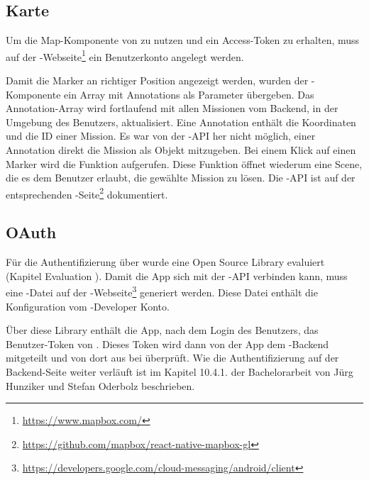 \subsection{Karte}
Um die Map-Komponente von  zu nutzen und ein Access-Token zu erhalten, muss auf der -Webseite\footnote{\url{https://www.mapbox.com/}} ein Benutzerkonto angelegt werden. 

Damit die Marker an richtiger Position angezeigt werden, wurden der -Komponente ein Array mit Annotations als Parameter übergeben. 
Das Annotation-Array wird fortlaufend mit allen Missionen vom \gls{Backend}, in der Umgebung des Benutzers, aktualisiert. 
Eine Annotation enthält die Koordinaten und die ID einer Mission. 
Es war von der -\gls{API} her nicht möglich, einer Annotation direkt die Mission als Objekt mitzugeben. 
Bei einem Klick auf einen Marker wird die Funktion  aufgerufen.
Diese Funktion öffnet wiederum eine Scene, die es dem Benutzer erlaubt, die gewählte Mission zu lösen.
Die -\gls{API} ist auf der entsprechenden -Seite\footnote{\url{https://github.com/mapbox/react-native-mapbox-gl}} dokumentiert. 


\subsection{OAuth}
Für die Authentifizierung über  wurde eine Open Source \gls{Library} evaluiert (Kapitel Evaluation ). 
Damit die App sich mit der -\gls{API} verbinden kann, muss eine -Datei auf der -Webseite\footnote{\url{https://developers.google.com/cloud-messaging/android/client}} generiert werden. 
Diese Datei enthält die Konfiguration vom -Developer Konto. 

Über diese \gls{Library} enthält die App, nach dem Login des Benutzers, das Benutzer-Token von .
Dieses Token wird dann von der App dem \kort{}-\gls{Backend} mitgeteilt und von dort aus bei  überprüft. 
Wie die Authentifizierung auf der \gls{Backend}-Seite weiter verläuft ist im Kapitel 10.4.1. der Bachelorarbeit von Jürg Hunziker und Stefan Oderbolz beschrieben.\cite{ba-kort-2012}